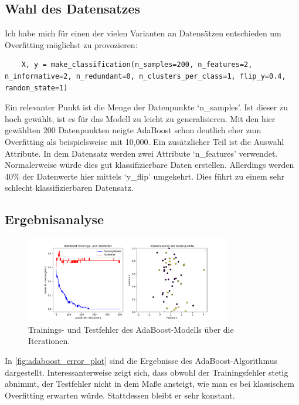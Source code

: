 \subsection{Wahl des Datensatzes} 
Ich habe mich für einen der vielen Varianten an Datensätzen entschieden um Overfitting möglichst zu provozieren:

\begin{lstlisting}
    X, y = make_classification(n_samples=200, n_features=2, n_informative=2, n_redundant=0, n_clusters_per_class=1, flip_y=0.4, random_state=1)
\end{lstlisting}    
Ein relevanter Punkt ist die Menge der Datenpunkte `n\_samples'. Ist dieser zu hoch 
gewählt, ist es für das Modell zu leicht zu generalisieren. Mit den hier gewählten 200 Datenpunkten neigte AdaBoost schon deutlich eher zum Overfitting als beispielsweise mit 10,000.
\newline
Ein zusätzlicher Teil ist die Auswahl Attribute. In dem Datensatz werden zwei Attribute `n\_features' verwendet. Normalerweise würde dies gut klassifizierbare Daten erstellen. Allerdings werden 40\% der Datenwerte hier mittels `y\_flip' umgekehrt. Dies führt zu einem sehr schlecht klassifizierbaren Datensatz.

\subsection{Ergebnisanalyse}
\begin{figure}[h]
    \centering
    \includegraphics[width=0.8\textwidth]{Images/AdaBoost_Error_Plot.png}
    \caption{Trainings- und Testfehler des AdaBoost-Modells über die Iterationen.}
    \label{fig:adaboost_error_plot}
\end{figure}
In \autoref{fig:adaboost_error_plot} sind die Ergebnisse des AdaBoost-Algorithmus dargestellt. Interessanterweise zeigt sich, dass obwohl der Trainingsfehler stetig abnimmt, der Testfehler nicht in dem Maße ansteigt, wie man es bei klassischem Overfitting erwarten würde. Stattdessen bleibt er sehr konstant.

